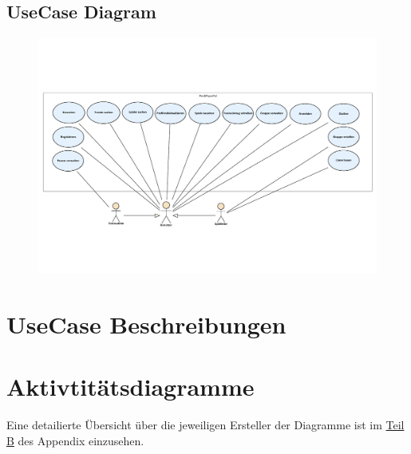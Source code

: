 \documentclass[DIV=13, 10pt,a4paper]{scrartcl}
\begin{document}
\newpage
\begin{landscape}
	\thispagestyle{empty}
	\section{UseCase Diagram}
	\begin{figure}[h!]
		\centering
		\includegraphics[width=\textheight]{docs/1_UseCaseDiagramme/PrimaryUseCases.pdf}
		\label{fig:UCD}
	\end{figure}
	\restoregeometry
\end{landscape}

\newpage
\section{UseCase Beschreibungen}





\pagebreak

\section{Aktivtitätsdiagramme}




\vfill
Eine detailierte Übersicht über die jeweiligen Ersteller der Diagramme ist im \hyperref[app:B_DiagrammUebersicht]{Teil B} des Appendix einzusehen.
\end{document}
